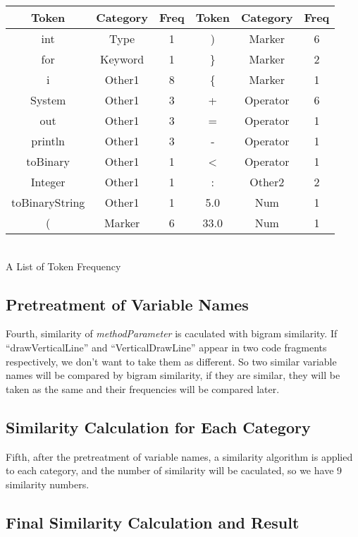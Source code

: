 \documentclass[../main.tex]{subfiles}
\begin{document}
\begin{tablehere}
\footnotesize
\begin{tabular}[h]{|c|c|c||c|c|c|}
\hline
Token & Category & Freq 	& Token & Category & Freq\\
\hline
int & Type &1 		&  ) & Marker & 6\\
\hline
for & Keyword & 1 	& \} & Marker & 2\\
\hline
i & Other1 & 8		& \{ & Marker & 1\\
\hline
System & Other1 & 3	& + & Operator & 6\\
\hline
out & Other1 & 3	& = & Operator & 1\\
\hline
println & Other1 & 3	& - & Operator & 1\\
\hline
toBinary & Other1 & 1	& < & Operator & 1\\
\hline
Integer & Other1 & 1	& : & Other2 & 2\\
\hline
toBinaryString & Other1 & 1	& 5.0 & Num & 1\\
\hline
( & Marker & 6		& 33.0 & Num & 1\\
\hline
\end{tabular}\\
\caption{A List of Token Frequency}\label{tab:Table_1}
\end{tablehere}

\subsection{Pretreatment of Variable Names}

Fourth, similarity of \textit{methodParameter} is caculated with bigram similarity. If ``drawVerticalLine'' and ``VerticalDrawLine'' appear in two code fragments respectively, we don't want to take them as different. So two similar variable names will be compared by bigram similarity, if they are similar, they will be taken as the same and their frequencies will be compared later.

\subsection{Similarity Calculation for Each Category}

Fifth, after the pretreatment of variable names, a similarity algorithm is applied to each category, and the number of similarity will be caculated, so we have 9 similarity numbers.

\subsection{Final Similarity Calculation and Result}
\end{document}
